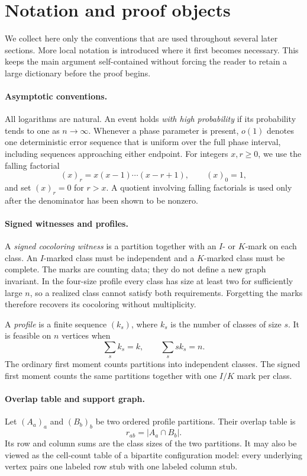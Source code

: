 \section*{Notation and proof objects}
\label{sec:conventions-v3}

We collect here only the conventions that are used throughout several later
sections. More local notation is introduced where it first becomes necessary.
This keeps the main argument self-contained without forcing the reader to
retain a large dictionary before the proof begins.

\paragraph{Asymptotic conventions.}
All logarithms are natural. An event holds \emph{with high probability} if its
probability tends to one as $n\to\infty$. Whenever a phase parameter is
present, $o(1)$ denotes one deterministic error sequence that is uniform over
the full phase interval, including sequences approaching either endpoint.
For integers $x,r\ge0$, we use the falling factorial
\[
  (x)_r=x(x-1)\cdots(x-r+1),
  \qquad
  (x)_0=1,
\]
and set $(x)_r=0$ for $r>x$. A quotient involving falling factorials is used
only after the denominator has been shown to be nonzero.

\paragraph{Signed witnesses and profiles.}
A \emph{signed cocoloring witness} is a partition together with an $I$- or
$K$-mark on each class. An $I$-marked class must be independent and a
$K$-marked class must be complete. The marks are counting data; they do not
define a new graph invariant. In the four-size profile every class has size at
least two for sufficiently large $n$, so a realized class cannot satisfy both
requirements. Forgetting the marks therefore recovers its cocoloring without
multiplicity.

A \emph{profile} is a finite sequence $(k_s)$, where $k_s$ is the number of
classes of size $s$. It is feasible on $n$ vertices when
\[
  \sum_s k_s=k,
  \qquad
  \sum_s s k_s=n.
\]
The ordinary first moment counts partitions into independent classes. The
signed first moment counts the same partitions together with one $I/K$ mark
per class.

\paragraph{Overlap table and support graph.}
Let $(A_a)_a$ and $(B_b)_b$ be two ordered profile partitions. Their overlap
table is
\[
  r_{ab}=|A_a\cap B_b|.
\]
Its row and column sums are the class sizes of the two partitions. It may also
be viewed as the cell-count table of a bipartite configuration model: every
underlying vertex pairs one labeled row stub with one labeled column stub.

